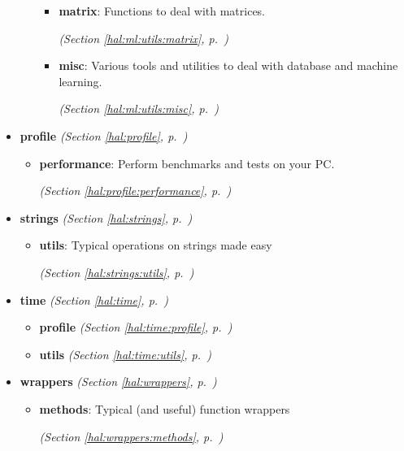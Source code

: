 \begin{itemize}
\begin{itemize}
      \begin{itemize}
    \setlength{\parskip}{0ex}
        \item \textbf{matrix}: Functions to deal with matrices. 


  \textit{(Section \ref{hal:ml:utils:matrix}, p.~\pageref{hal:ml:utils:matrix})}

        \item \textbf{misc}: Various tools and utilities to deal with database and machine learning. 


  \textit{(Section \ref{hal:ml:utils:misc}, p.~\pageref{hal:ml:utils:misc})}

      \end{itemize}
  \end{itemize}
\item \textbf{profile}
  \textit{(Section \ref{hal:profile}, p.~\pageref{hal:profile})}

  \begin{itemize}
\setlength{\parskip}{0ex}
    \item \textbf{performance}: Perform benchmarks and tests on your PC. 


  \textit{(Section \ref{hal:profile:performance}, p.~\pageref{hal:profile:performance})}

  \end{itemize}
\item \textbf{strings}
  \textit{(Section \ref{hal:strings}, p.~\pageref{hal:strings})}

  \begin{itemize}
\setlength{\parskip}{0ex}
    \item \textbf{utils}: Typical operations on strings made easy 


  \textit{(Section \ref{hal:strings:utils}, p.~\pageref{hal:strings:utils})}

  \end{itemize}
\item \textbf{time}
  \textit{(Section \ref{hal:time}, p.~\pageref{hal:time})}

  \begin{itemize}
\setlength{\parskip}{0ex}
    \item \textbf{profile}
  \textit{(Section \ref{hal:time:profile}, p.~\pageref{hal:time:profile})}

    \item \textbf{utils}
  \textit{(Section \ref{hal:time:utils}, p.~\pageref{hal:time:utils})}

  \end{itemize}
\item \textbf{wrappers}
  \textit{(Section \ref{hal:wrappers}, p.~\pageref{hal:wrappers})}

  \begin{itemize}
\setlength{\parskip}{0ex}
    \item \textbf{methods}: Typical (and useful) function wrappers 


  \textit{(Section \ref{hal:wrappers:methods}, p.~\pageref{hal:wrappers:methods})}

  \end{itemize}
\end{itemize}


